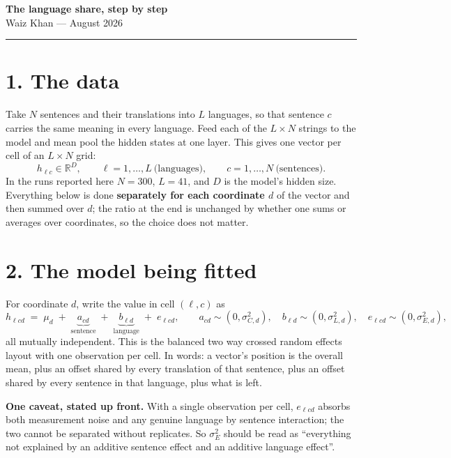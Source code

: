 \documentclass[11pt]{article}
\newcommand{\Hi}[1]{{\color[HTML]{2B6CB0}\textbf{#1}}}
\begin{document}
\begin{center}
{\Large\textbf{The language share, step by step}}\\[3pt]
{\small Waiz Khan --- August 2026}
\end{center}
\vspace{4pt}\hrule\vspace{10pt}

\section*{1. The data}
Take $N$ sentences and their translations into $L$ languages, so that
sentence $c$ carries the same meaning in every language. Feed each of
the $L \times N$ strings to the model and mean pool the hidden states
at one layer. This gives one vector per cell of an $L \times N$ grid:
\[
h_{\ell c} \in \mathbb{R}^{D}, \qquad \ell = 1,\dots,L \ \text{(languages)},
\qquad c = 1,\dots,N \ \text{(sentences)} .
\]
In the runs reported here $N = 300$, $L = 41$, and $D$ is the model's
hidden size. Everything below is done \Hi{separately for each
coordinate $d$} of the vector and then summed over $d$; the ratio at
the end is unchanged by whether one sums or averages over coordinates,
so the choice does not matter.

\section*{2. The model being fitted}
For coordinate $d$, write the value in cell $(\ell,c)$ as
\[
h_{\ell c d} \;=\; \mu_d \;+\; \underbrace{a_{cd}}_{\text{sentence}}
\;+\; \underbrace{b_{\ell d}}_{\text{language}} \;+\; e_{\ell c d},
\qquad
a_{cd} \sim (0,\sigma^2_{C,d}), \quad
b_{\ell d} \sim (0,\sigma^2_{L,d}), \quad
e_{\ell c d} \sim (0,\sigma^2_{E,d}),
\]
all mutually independent. This is the balanced two way crossed random
effects layout with one observation per cell. In words: a vector's
position is the overall mean, plus an offset shared by every
translation of that sentence, plus an offset shared by every sentence
in that language, plus what is left.

\Hi{One caveat, stated up front.} With a single observation per cell,
$e_{\ell c d}$ absorbs both measurement noise and any genuine
language by sentence interaction; the two cannot be separated without
replicates. So $\sigma^2_E$ should be read as ``everything not
explained by an additive sentence effect and an additive language
effect''.
\end{document}
